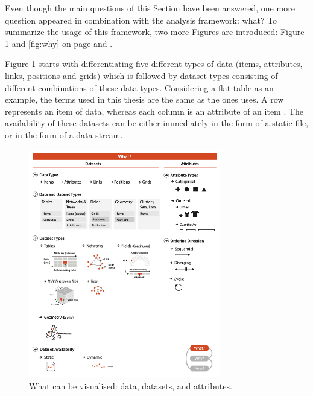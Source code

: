 Even though the main questions of this Section have been answered, one more question appeared in combination with the analysis framework: what? To summarize the usage of this framework, two more Figures are introduced: Figure \ref{fig:what} and \ref{fig:why} on page \pageref{fig:what} and \pageref{fig:why}.

\cbstart
Figure \ref{fig:what} starts with differentiating five different types of data (items, attributes, links, positions and grids) which is followed by dataset types consisting of different combinations of these data types. Considering a flat table as an example, the terms used in this thesis are the same as the ones \citeauthor{Munzner2014} uses. A row represents an item of data, whereas each column is an attribute of an item .
\cbend
The availability of these datasets can be either immediately in the form of a static file, or in the form of a data stream.

\begin{figure}[!htb]
\centering
\includegraphics[height=10cm,keepaspectratio]{images/basics/what.png}
\caption[
    What can be visualised: data, datasets, and attributes .
]{What can be visualised: data, datasets, and attributes.}
\label{fig:what}
\end{figure}

